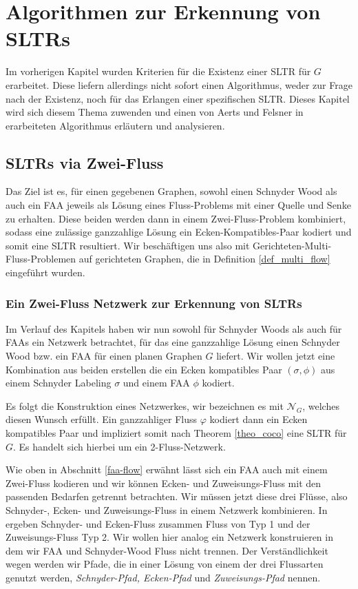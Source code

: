 \chapter{Algorithmen zur Erkennung von SLTRs}\label{main_algo}

Im vorherigen Kapitel wurden Kriterien für die Existenz einer SLTR für $G$ erarbeitet. Diese liefern allerdings nicht sofort einen Algorithmus, weder zur Frage nach der Existenz, noch für das Erlangen einer spezifischen SLTR. Dieses Kapitel wird sich diesem Thema zuwenden und einen von Aerts und Felsner in \cite{af15} erarbeiteten Algorithmus erläutern und analysieren.

\section{SLTRs via Zwei-Fluss}

Das Ziel ist es, für einen gegebenen Graphen, sowohl einen Schnyder Wood als auch ein FAA jeweils als Lösung eines Fluss-Problems mit einer Quelle und Senke zu erhalten. Diese beiden werden dann in einem Zwei-Fluss-Problem kombiniert, sodass eine zulässige ganzzahlige Lösung ein Ecken-Kompatibles-Paar kodiert und somit eine SLTR resultiert. Wir beschäftigen uns also mit Gerichteten-Multi-Fluss-Problemen auf gerichteten Graphen, die in Definition \ref{def_multi_flow} eingeführt wurden.



\subsection{Ein Zwei-Fluss Netzwerk zur Erkennung von SLTRs}

Im Verlauf des Kapitels haben wir nun sowohl für Schnyder Woods als auch für FAAs ein Netzwerk betrachtet, für das eine ganzzahlige Lösung einen Schnyder Wood bzw. ein FAA für einen planen Graphen $G$ liefert. Wir wollen jetzt eine Kombination aus beiden erstellen die ein Ecken kompatibles Paar $(\sigma,\phi)$ aus einem Schnyder Labeling $\sigma$ und einem FAA $\phi$  kodiert.\

Es folgt die Konstruktion eines Netzwerkes, wir bezeichnen es mit $\mathcal{N}_G$, welches diesen Wunsch erfüllt. Ein ganzzahliger Fluss $\varphi$ kodiert dann ein Ecken kompatibles Paar und impliziert somit nach Theorem \ref{theo_coco} eine SLTR für $G$. Es handelt sich hierbei um ein 2-Fluss-Netzwerk.

Wie oben in Abschnitt \ref{faa-flow} erwähnt lässt sich ein FAA auch mit einem Zwei-Fluss kodieren und wir können Ecken- und Zuweisungs-Fluss mit den passenden Bedarfen getrennt betrachten. Wir müssen jetzt diese drei Flüsse, also Schnyder-, Ecken- und Zuweisungs-Fluss in einem Netzwerk kombinieren. In \cite{af15} ergeben Schnyder- und Ecken-Fluss zusammen Fluss von Typ 1 und der Zuweisungs-Fluss Typ 2. Wir wollen hier analog ein Netzwerk konstruieren in dem wir FAA und Schnyder-Wood Fluss nicht trennen. Der Verständlichkeit wegen werden wir Pfade, die in einer Lösung von einem der drei Flussarten genutzt werden, \textit{Schnyder-Pfad, Ecken-Pfad} und \textit{Zuweisungs-Pfad} nennen.\\


